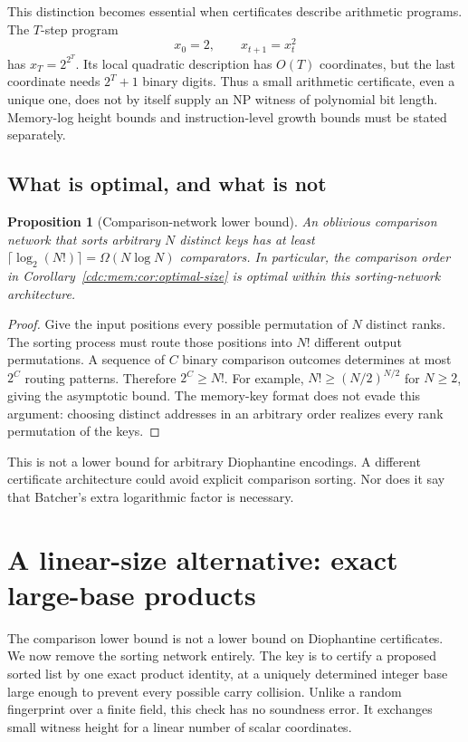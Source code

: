 \documentclass[11pt,a4paper]{article}
\newtheorem{proposition}[proposition]{Proposition}
\theoremstyle{definition}
\theoremstyle{remark}
\newcommand{\srctag}[1]{\texorpdfstring{\hspace{0.5em}{\normalfont\small\color{accent}[#1]}}{ [#1]}}
\begin{document}
This distinction becomes essential when certificates describe arithmetic
programs. The $T$-step program
\[
 x_0=2,\qquad x_{t+1}=x_t^2
\]
has $x_T=2^{2^T}$. Its local quadratic description has $O(T)$ coordinates, but
the last coordinate needs $2^T+1$ binary digits. Thus a small arithmetic
certificate, even a unique one, does not by itself supply an NP witness of
polynomial bit length. Memory-log height bounds and instruction-level growth
bounds must be stated separately.

\subsection{What is optimal, and what is not}
\begin{proposition}[Comparison-network lower bound]\label{cdc:mem:prop:lower}
An oblivious comparison network that sorts arbitrary $N$ distinct keys has at
least $\lceil\log_2(N!)\rceil=\Omega(N\log N)$ comparators. In particular, the
comparison order in Corollary~\ref{cdc:mem:cor:optimal-size} is optimal \emph{within
this sorting-network architecture}.
\end{proposition}
\begin{proof}
Give the input positions every possible permutation of $N$ distinct ranks.
The sorting process must route those positions into $N!$ different output
permutations. A sequence of $C$ binary comparison outcomes determines at most
$2^C$ routing patterns. Therefore $2^C\geq N!$. For example,
$N!\geq(N/2)^{N/2}$ for $N\geq2$, giving the asymptotic bound.
The memory-key format does not evade this argument: choosing distinct
addresses in an arbitrary order realizes every rank permutation of the keys.
\end{proof}
This is not a lower bound for arbitrary Diophantine encodings. A different
certificate architecture could avoid explicit comparison sorting. Nor does it
say that Batcher's extra logarithmic factor is necessary.

\section{A linear-size alternative: exact large-base products\srctag{03}}\label{cdc:mem:sec:linear}
The comparison lower bound is not a lower bound on Diophantine certificates.
We now remove the sorting network entirely. The key is to certify a proposed
sorted list by one exact product identity, at a uniquely determined integer
base large enough to prevent every possible carry collision. Unlike a random
fingerprint over a finite field, this check has no soundness error. It exchanges
small witness height for a linear number of scalar coordinates.
\end{document}
